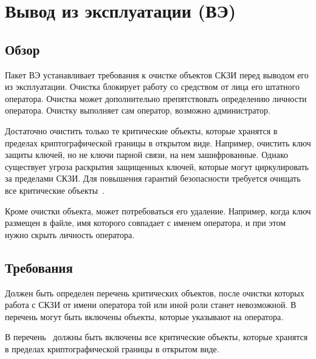 \section{Вывод из эксплуатации (ВЭ)}\label{DE}

\subsection{Обзор}\label{DE.Intro}

Пакет ВЭ устанавливает требования к очистке объектов СКЗИ перед
выводом его из эксплуатации. Очистка блокирует работу со средством от  
лица его штатного оператора. Очистка может дополнительно препятствовать 
определению личности оператора. Очистку выполняет сам оператор,
возможно администратор.

Достаточно очистить только те критические объекты, которые хранятся в 
пределах криптографической границы в открытом виде.
%
Например, очистить ключ защиты ключей, но не ключи парной связи, на нем 
зашифрованные.
%
Однако существует угроза раскрытия защищенных ключей, которые могут 
циркулировать за пределами СКЗИ. Для повышения гарантий безопасности требуется 
очищать все критические объекты~.

Кроме очистки объекта, может потребоваться его удаление. Например, когда ключ 
размещен в файле, имя которого совпадает с именем оператора, и при этом нужно 
скрыть личность оператора.


\subsection{Требования}\label{DE.Reqs}

\label{R.DE.List}
Должен быть определен перечень критических объектов, 
после очистки которых работа с СКЗИ от имени оператора
той или иной роли станет невозможной. 
%
В перечень могут быть включены объекты, которые указывают на оператора.

\label{R.DE.Short}
В перечень~ должны быть включены все критические объекты, 
которые хранятся в пределах криптографической границы в открытом виде.


